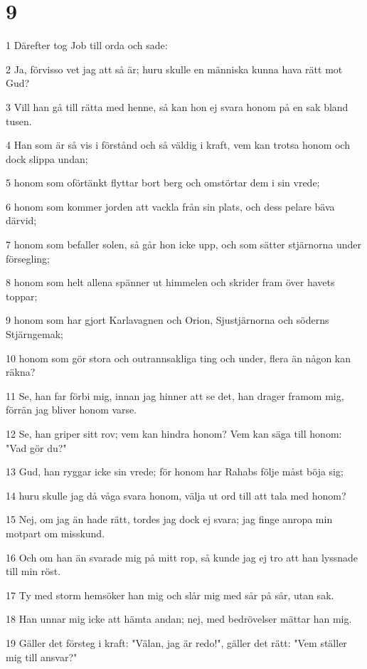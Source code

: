 \chapter{9}

\par 1 Därefter tog Job till orda och sade:
\par 2 Ja, förvisso vet jag att så är; huru skulle en människa kunna hava rätt mot Gud?
\par 3 Vill han gå till rätta med henne, så kan hon ej svara honom på en sak bland tusen.
\par 4 Han som är så vis i förstånd och så väldig i kraft, vem kan trotsa honom och dock slippa undan;
\par 5 honom som oförtänkt flyttar bort berg och omstörtar dem i sin vrede;
\par 6 honom som kommer jorden att vackla från sin plats, och dess pelare bäva därvid;
\par 7 honom som befaller solen, så går hon icke upp, och som sätter stjärnorna under försegling;
\par 8 honom som helt allena spänner ut himmelen och skrider fram över havets toppar;
\par 9 honom som har gjort Karlavagnen och Orion, Sjustjärnorna och söderns Stjärngemak;
\par 10 honom som gör stora och outrannsakliga ting och under, flera än någon kan räkna?
\par 11 Se, han far förbi mig, innan jag hinner att se det, han drager framom mig, förrän jag bliver honom varse.
\par 12 Se, han griper sitt rov; vem kan hindra honom? Vem kan säga till honom: "Vad gör du?"
\par 13 Gud, han ryggar icke sin vrede; för honom har Rahabs följe måst böja sig;
\par 14 huru skulle jag då våga svara honom, välja ut ord till att tala med honom?
\par 15 Nej, om jag än hade rätt, tordes jag dock ej svara; jag finge anropa min motpart om misskund.
\par 16 Och om han än svarade mig på mitt rop, så kunde jag ej tro att han lyssnade till min röst.
\par 17 Ty med storm hemsöker han mig och slår mig med sår på sår, utan sak.
\par 18 Han unnar mig icke att hämta andan; nej, med bedrövelser mättar han mig.
\par 19 Gäller det försteg i kraft: "Välan, jag är redo!", gäller det rätt: "Vem ställer mig till ansvar?"
